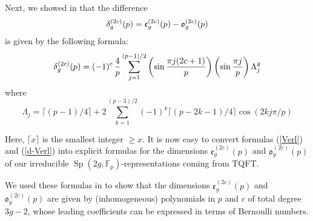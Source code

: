 \documentclass{amsart}
\begin{document}
Next, we showed in \cite{GM4} that 
the difference 
\begin{equation} {\label{{sum2}}{
	\if{n} y
		\smash{\makebox[0pt]{\hspace{-0.5in}
			\raisebox{8pt}{\tt\tiny {{sum2}}}}}
	\fi
}} \delta_g^{(2c)}(p)=
  {\mathfrak{e}}_g^{(2c)}(p)-{\mathfrak{o}}_g^{(2c)}(p) 
\end{equation} 
is given by  
the following  
formula:
\begin{equation}{\label{{d-Verl}}{
	\if{n} y
		\smash{\makebox[0pt]{\hspace{-0.5in}
			\raisebox{8pt}{\tt\tiny {{d-Verl}}}}}
	\fi
}}  \delta_g^{(2c)}(p)= (-1)^c \,\frac{4}{p}
  \sum_{j=1}^{(p-1)/2}  \left(\sin\frac{\pi j (2c+1)}{p}\right) \left(\sin\frac{\pi j}{p}\right) \Lambda_j^g
\end{equation} 
where  $$\Lambda_j= \lceil (p-1) /4 \rceil + 2 \sum_{k=1}^{(p-3)/2}(-1)^k \lceil
(p-2k-1)/ 4 \rceil   \cos (2kj\pi/p)$$ 

Here, $\lceil x \rceil$ is the smallest integer $\geq x$.  
It is 
now 
easy to convert formulas 
(\ref{Verl}) and (\ref{d-Verl}) into
 explicit 
formulas for the 
dimensions ${\mathfrak{e}}_g^{(2c)}(p)$ and $ {\mathfrak{o}}_g^{(2c)}(p)$ of our irreducible  
$\operatorname{Sp}(2g,{{\mathbb{F}}}_p)$-representations 
coming from  TQFT.
 

\vskip 8pt  We used these formulas in \cite{GM4} to show that the dimensions ${\mathfrak{e}}_g^{(2c)}(p)$ and $ {\mathfrak{o}}_g^{(2c)}(p)$ are
given by (inhomogeneous) polynomials in $p$ and $c$ of total degree
 $3g-2$, whose leading coefficients can be expressed in terms of Bernoulli
 numbers. 
\end{document}

